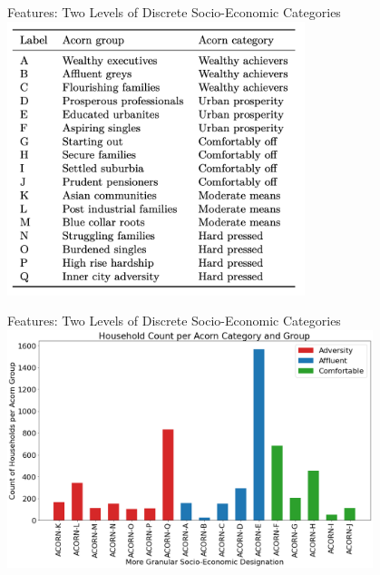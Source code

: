 \documentclass{beamer}
\begin{document}

\begin{frame}{Features: Two Levels of Discrete Socio-Economic Categories}
  \centering
  \includegraphics[width=0.65\textwidth]{images/acorn-groups.png}
\end{frame}


\begin{frame}{Features: Two Levels of Discrete Socio-Economic Categories}
  \centering
  \includegraphics[width=0.8\textwidth]{images/acorn-group-category-house-count.png}
\end{frame}
\end{document}
